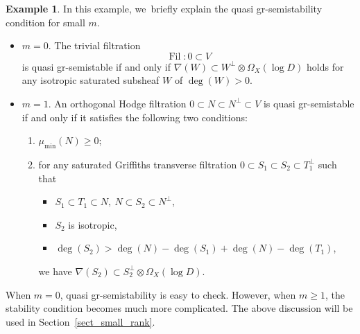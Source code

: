 \documentclass[11pt]{article}
\numberwithin{equation}{section}
\newcommand{\grsemistable}{gr\nobreakdash-semi\-stable\xspace}
\DeclareMathOperator{\Filt}{Fil}
\theoremstyle{plain}
\theoremstyle{definition}
\newtheorem{examp}[thm]{Example}
\begin{document}
\begin{examp}\label{smallm}
In this example, we~briefly explain the quasi gr-semistability condition for small $m$.

\begin{itemize}
\item $m=0$.
The trivial filtration
\[
\Filt:0\subset V
\]
is quasi \grsemistable if and only if $\nabla(W)\subset W^\perp\otimes\Omega_X(\log D)$ holds for any isotropic saturated subsheaf $W$ of $\deg(W)>0$.

\item $m=1$.
An orthogonal Hodge filtration $0\subset N\subset N^\perp\subset V$ is quasi \grsemistable if and only if it satisfies the following two conditions:
\begin{enumerate}
\item $\mu_{\min}(N)\geq 0$;
\item for any saturated Griffiths transverse filtration $0\!\subset\! S_1\!\subset\! S_2\!\subset\! T_1^\perp$ such that
\begin{itemize}
\item[$\scriptscriptstyle\bullet$] $S_1\subset T_1\subset N,\ N\subset S_2\subset N^\perp $,
\item[$\scriptscriptstyle\bullet$] $S_2$ is isotropic,
\item[$\scriptscriptstyle\bullet$] $\deg(S_2)>\deg(N)-\deg(S_1)+\deg(N)-\deg(T_1)$,
\end{itemize}
we have $\nabla(S_2)\subset S_2^\perp\otimes \Omega_X(\log D)$.
\end{enumerate}
\end{itemize}
When $m=0$, quasi gr-semistability is easy to check. However, when $m \geq 1$, the stability condition becomes much more complicated. The above discussion will be used in Section~\ref{sect_small_rank}.
\end{examp}
\end{document}
